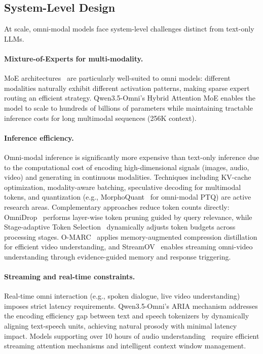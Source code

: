 \documentclass{article}
\begin{document}
\subsection{System-Level Design}

At scale, omni-modal models face system-level challenges distinct from text-only LLMs.

\paragraph{Mixture-of-Experts for multi-modality.}
MoE architectures~\cite{qwen2026omni} are particularly well-suited to omni models: different modalities naturally exhibit different activation patterns, making sparse expert routing an efficient strategy.
Qwen3.5-Omni's Hybrid Attention MoE enables the model to scale to hundreds of billions of parameters while maintaining tractable inference costs for long multimodal sequences (256K context).

\paragraph{Inference efficiency.}
Omni-modal inference is significantly more expensive than text-only inference due to the computational cost of encoding high-dimensional signals (images, audio, video) and generating in continuous modalities.
Techniques including KV-cache optimization, modality-aware batching, speculative decoding for multimodal tokens, and quantization (e.g., MorphoQuant~\cite{placeholder2025morphoquant} for omni-modal PTQ) are active research areas.
Complementary approaches reduce token counts directly: OmniDrop~\cite{placeholder2026omnidrop} performs layer-wise token pruning guided by query relevance, while Stage-adaptive Token Selection~\cite{placeholder2026stageadaptive} dynamically adjusts token budgets across processing stages.
O-MARC~\cite{placeholder2026omarc} applies memory-augmented compression distillation for efficient video understanding, and StreamOV~\cite{placeholder2026streamov} enables streaming omni-video understanding through evidence-guided memory and response triggering.

\paragraph{Streaming and real-time constraints.}
Real-time omni interaction (e.g., spoken dialogue, live video understanding) imposes strict latency requirements.
Qwen3.5-Omni's ARIA mechanism addresses the encoding efficiency gap between text and speech tokenizers by dynamically aligning text-speech units, achieving natural prosody with minimal latency impact.
Models supporting over 10 hours of audio understanding~\cite{qwen2026omni} require efficient streaming attention mechanisms and intelligent context window management.
\end{document}
